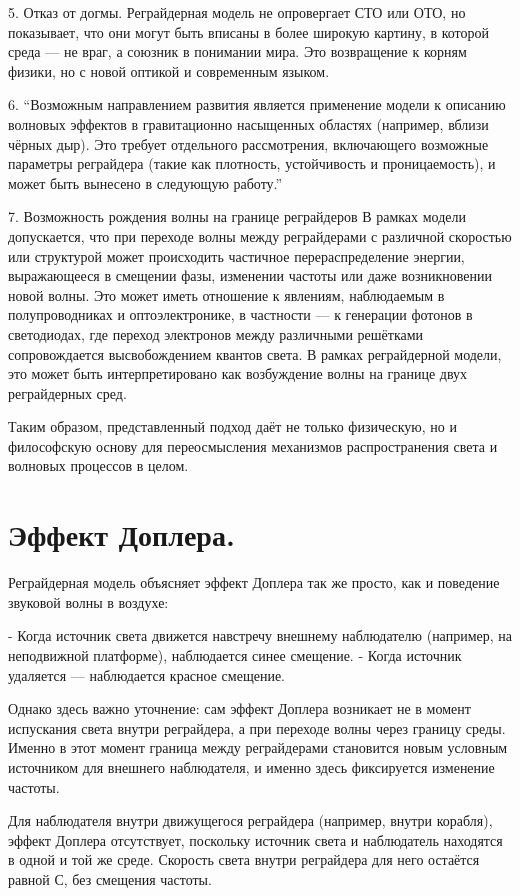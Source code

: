 \documentclass[12pt]{article}
\begin{document}
5. Отказ от догмы.
Реграйдерная модель не опровергает СТО или ОТО, но показывает, что они могут быть вписаны в более широкую картину, в которой среда — не враг, а союзник в понимании мира. Это возвращение к корням физики, но с новой оптикой и современным языком.

6. “Возможным направлением развития является применение модели к описанию волновых эффектов в гравитационно насыщенных областях (например, вблизи чёрных дыр). Это требует отдельного рассмотрения, включающего возможные параметры реграйдера (такие как плотность, устойчивость и проницаемость), и может быть вынесено в следующую работу.”

7. Возможность рождения волны на границе реграйдеров
В рамках модели допускается, что при переходе волны между реграйдерами с различной скоростью или структурой может происходить частичное перераспределение энергии, выражающееся в смещении фазы, изменении частоты или даже возникновении новой волны. Это может иметь отношение к явлениям, наблюдаемым в полупроводниках и оптоэлектронике, в частности — к генерации фотонов в светодиодах, где переход электронов между различными решётками сопровождается высвобождением квантов света. В рамках реграйдерной модели, это может быть интерпретировано как возбуждение волны на границе двух реграйдерных сред.

Таким образом, представленный подход даёт не только физическую, но и философскую основу для переосмысления механизмов распространения света и волновых процессов в целом.


\section*{Эффект Доплера.}

Реграйдерная модель объясняет эффект Доплера так же просто, как и поведение звуковой волны в воздухе:

- Когда источник света движется навстречу внешнему наблюдателю (например, на неподвижной платформе), наблюдается синее смещение.
- Когда источник удаляется — наблюдается красное смещение.

Однако здесь важно уточнение: сам эффект Доплера возникает не в момент испускания света внутри реграйдера, а при переходе волны через границу среды. Именно в этот момент граница между реграйдерами становится новым условным источником для внешнего наблюдателя, и именно здесь фиксируется изменение частоты.

Для наблюдателя внутри движущегося реграйдера (например, внутри корабля), эффект Доплера отсутствует, поскольку источник света и наблюдатель находятся в одной и той же среде. Скорость света внутри реграйдера для него остаётся равной С, без смещения частоты.
\end{document}
